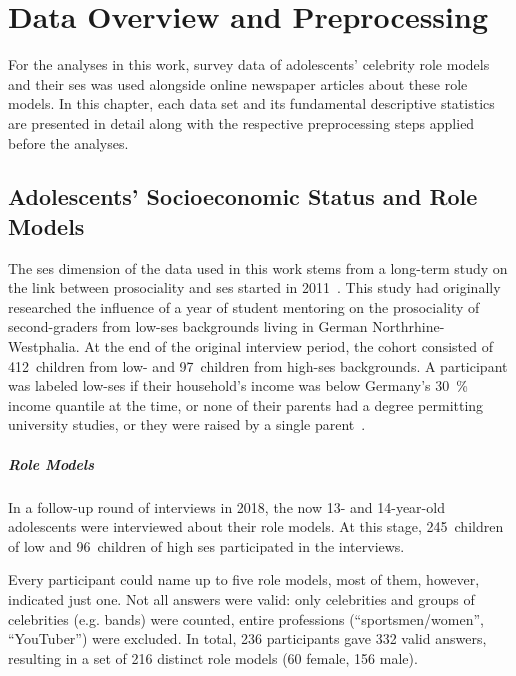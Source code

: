 \renewcommand{\imagepath}{../30-data/img}

\chapter{Data Overview and Preprocessing}\label{ch:data}
For the analyses in this work, survey data of adolescents' celebrity role models and their \gls{ses} was used alongside online newspaper articles about these role models. In this chapter, each data set and its fundamental descriptive statistics are presented in detail along with the respective preprocessing steps applied before the analyses.

\section{Adolescents' Socioeconomic Status and Role Models}
The \gls{ses} dimension of the data used in this work stems from a long-term study on the link between prosociality and \gls{ses} started in 2011~\autocite{kosse_formation_2020}. This study had originally researched the influence of a year of student mentoring on the prosociality of second-graders from low-\gls{ses} backgrounds living in German Northrhine-Westphalia. At the end of the original interview period, the cohort consisted of \SI{412}{children} from low- and \SI{97}{children} from high-\gls{ses} backgrounds. A participant was labeled low-\gls{ses} if their household's income was below Germany's \SI{30}{\percent} income quantile at the time, or none of their parents had a degree permitting university studies, or they were raised by a single parent~\autocite{kosse_formation_2020}.

\paragraph{Role Models}
In a follow-up round of interviews in 2018, the now 13- and 14-year-old adolescents were interviewed about their role models. At this stage, \SI{245}{children} of low and \SI{96}{children} of high \gls{ses} participated in the interviews.

Every participant could name up to five role models, most of them, however, indicated just one. Not all answers were valid: only celebrities and groups of celebrities (e.g. bands) were counted, entire professions (``sportsmen/women'', ``YouTuber'') were excluded. In total, \SI{236}{} participants gave \SI{332}{} valid answers, resulting in a set of \SI{216}{} distinct role models (\SI{60}{} female, \SI{156}{} male).

